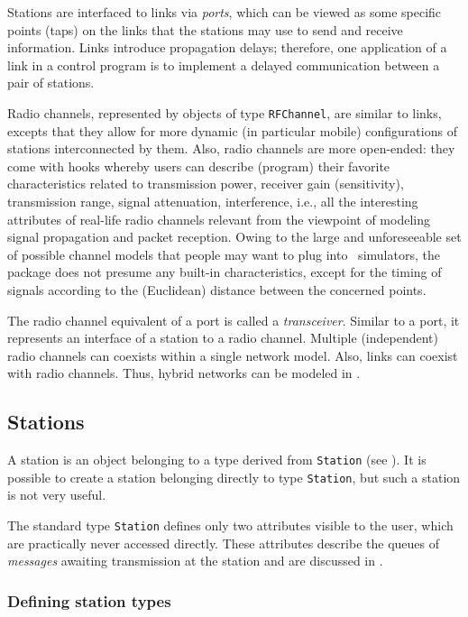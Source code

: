 Stations are interfaced to links via {\em ports},
which can be viewed as some specific points (taps) on the links
that the stations may use to send and receive information.
Links introduce propagation delays; therefore, one application of a link
in a control program is to implement a delayed communication between a pair
of stations.

Radio channels, represented by objects of type {\tt RFChannel}, are similar
to links, excepts that they allow for more dynamic (in particular mobile)
configurations of stations interconnected by them.
Also, radio channels are more open-ended: they come with hooks whereby users
can describe (program)
their favorite characteristics related to
transmission power, receiver gain (sensitivity), transmission
range, signal attenuation, interference, i.e., all the interesting attributes
of real-life radio channels relevant from the viewpoint of modeling signal
propagation and packet reception.
Owing to the large and unforeseeable set of possible channel models that
people may want to plug into \smurph\ simulators, the package does not
presume any built-in characteristics, except for the timing of signals
according to the (Euclidean) distance between the concerned points.

The radio channel equivalent of a port is called a {\em transceiver}.
Similar to a port, it represents an interface of a station to a
radio channel.
Multiple (independent) radio channels can coexists within a single network
model.
Also, links can coexist with radio channels.
Thus, hybrid networks can be modeled in \smurph.

\subsection{Stations}
\label{rm_to_st}

A station is an object belonging to a type derived from {\tt Station}
(see ).
It is possible to create a station belonging directly to type
{\tt Station}, but such a station is not very useful.

The standard type {\tt Station} defines only two attributes visible to the
user, which are practically never accessed directly.
These attributes describe the queues of {\em messages\/} awaiting transmission
at the station and are discussed in .

\subsubsection{Defining station types}
\label{rm_to_st_ds}

